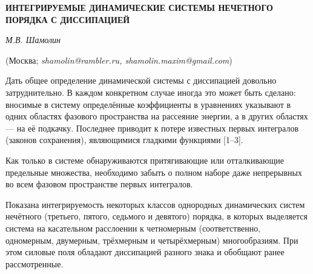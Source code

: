 \begin{center}
    {\bf ИНТЕГРИРУЕМЫЕ ДИНАМИЧЕСКИЕ СИСТЕМЫ НЕЧЕТНОГО ПОРЯДКА
С ДИССИПАЦИЕЙ}

    {\it М.В. Шамолин}

    (Москва; {\it shamolin@rambler.ru, shamolin.maxim@gmail.com})
\end{center}






Дать общее определение динамической системы с диссипацией довольно
затруднительно. В каждом конкретном случае иногда это может быть
сделано: вносимые в систему определённые коэффициенты в уравнениях
указывают в одних областях фазового пространства на рассеяние
энергии, а в других областях --- на её подкачку. Последнее приводит
к потере известных первых интегралов (законов сохранения),
являющимися гладкими функциями [1--3].

Как только в системе обнаруживаются притягивающие или отталкивающие
предельные множества, необходимо забыть о полном наборе даже
непрерывных во всем фазовом пространстве первых интегралов.

Показана интегрируемость некоторых классов однородных динамических
систем нечётного (третьего, пятого, седьмого и девятого) порядка, в
которых выделяется система на касательном расслоении к четномерным
(соответственно, одномерным, двумерным, трёхмерным и четырёхмерным)
многообразиям. При этом силовые поля обладают диссипацией разного
знака и обобщают ранее рассмотренные.

